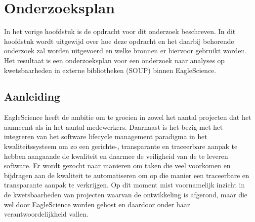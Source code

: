 \chapter{Onderzoeksplan}\label{ch:onderzoekPlan}

In het vorige hoofdstuk is de opdracht voor dit onderzoek beschreven. In dit hoofdstuk wordt uitgewijd over hoe deze opdracht en het daarbij behorende onderzoek zal worden uitgevoerd en welke bronnen er hiervoor gebruikt worden. Het resultaat is een onderzoeksplan voor een onderzoek naar analyses op kwetsbaarheden in externe bibliotheken (SOUP) binnen EagleScience.


\section{Aanleiding}\label{sec:OP_aanleiding}
EagleScience heeft de ambitie om te groeien in zowel het aantal projecten dat het aanneemt als in het aantal medewerkers. Daarnaast is het bezig met het integreren van het software lifecycle management paradigma in het kwaliteitssysteem om zo een gerichte-, transparante en traceerbare aanpak te hebben aangaande de kwaliteit en daarmee de veiligheid van de te leveren software. Er wordt gezocht naar manieren om taken die veel voorkomen en bijdragen aan de kwaliteit te automatiseren om op die manier een traceerbare en transparante aanpak te verkrijgen. Op dit moment mist voornamelijk inzicht in de kwetsbaarheden van projecten waarvan de ontwikkeling is afgerond, maar die wel door EagleScience worden gehost en daardoor onder haar verantwoordelijkheid vallen.


